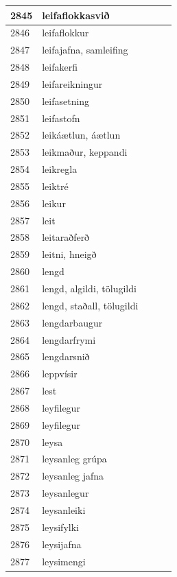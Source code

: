 \begin{longtable}{p{}|p{}|p{}|p{}|p{}}
\hline
2845 & leifaflokkasvið &  &  &  \\
\hline
2846 & leifaflokkur &  &  &  \\
\hline
2847 & leifajafna, samleifing &  &  &  \\
\hline
2848 & leifakerfi &  &  &  \\
\hline
2849 & leifareikningur &  &  &  \\
\hline
2850 & leifasetning &  &  &  \\
\hline
2851 & leifastofn &  &  &  \\
\hline
2852 & leikáætlun, áætlun &  &  &  \\
\hline
2853 & leikmaður, keppandi &  &  &  \\
\hline
2854 & leikregla &  &  &  \\
\hline
2855 & leiktré &  &  &  \\
\hline
2856 & leikur &  &  &  \\
\hline
2857 & leit &  &  &  \\
\hline
2858 & leitaraðferð &  &  &  \\
\hline
2859 & leitni, hneigð &  &  &  \\
\hline
2860 & lengd &  &  &  \\
\hline
2861 & lengd, algildi, tölugildi &  &  &  \\
\hline
2862 & lengd, staðall, tölugildi &  &  &  \\
\hline
2863 & lengdarbaugur &  &  &  \\
\hline
2864 & lengdarfrymi &  &  &  \\
\hline
2865 & lengdarsnið &  &  &  \\
\hline
2866 & leppvísir &  &  &  \\
\hline
2867 & lest &  &  &  \\
\hline
2868 & leyfilegur &  &  &  \\
\hline
2869 & leyfilegur &  &  &  \\
\hline
2870 & leysa &  &  &  \\
\hline
2871 & leysanleg grúpa &  &  &  \\
\hline
2872 & leysanleg jafna &  &  &  \\
\hline
2873 & leysanlegur &  &  &  \\
\hline
2874 & leysanleiki &  &  &  \\
\hline
2875 & leysifylki &  &  &  \\
\hline
2876 & leysijafna &  &  &  \\
\hline
2877 & leysimengi &  &  &  \\

\end{longtable}
